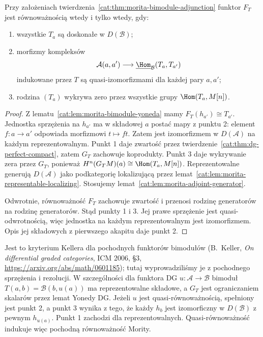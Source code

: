 \begin{twierdzenie}\label{cat:thm:morita-bimodule-criterion}
Przy założeniach twierdzenia~\ref{cat:thm:morita-bimodule-adjunction} funktor $F_T$ jest równoważnością wtedy i tylko wtedy, gdy:
\begin{enumerate}
 \item wszystkie $T_a$ są doskonałe w $D(\mathcal B)$;
 \item morfizmy kompleksów
 \[
 \mathcal A(a,a')\longrightarrow
 \underline{\Hom}_{\mathcal B}(T_a,T_{a'})
 \]
 indukowane przez $T$ są quasi-izomorfizmami dla każdej pary $a,a'$;
 \item rodzina $(T_a)$ wykrywa zero przez wszystkie grupy $\Hom(T_a,M[n])$.
\end{enumerate}
\end{twierdzenie}
\begin{proof}
Z lematu~\ref{cat:lem:morita-bimodule-yoneda} mamy $F_T(h_{a'})\cong T_{a'}$. Jednostka sprzężenia na $h_{a'}$ ma w składowej $a$ postać mapy z punktu 2: element $f:a\to a'$ odpowiada morfizmowi $t\mapsto ft$. Zatem jest izomorfizmem w $D(\mathcal A)$ na każdym reprezentowalnym. Punkt 1 daje zwartość przez twierdzenie~\ref{cat:thm:dg-perfect-compact}, zatem $G_T$ zachowuje koprodukty. Punkt 3 daje wykrywanie zera przez $G_T$, ponieważ $H^n(G_TM)(a)\cong\Hom(T_a,M[n])$. Reprezentowalne generują $D(\mathcal A)$ jako podkategorię lokalizującą przez lemat~\ref{cat:lem:morita-representable-localizing}. Stosujemy lemat~\ref{cat:lem:morita-adjoint-generator}.

Odwrotnie, równoważność $F_T$ zachowuje zwartość i przenosi rodzinę generatorów na rodzinę generatorów. Stąd punkty 1 i 3. Jej prawe sprzężenie jest quasi-odwrotnością, więc jednostka na każdym reprezentowalnym jest izomorfizmem. Opis jej składowych z pierwszego akapitu daje punkt 2.
\end{proof}

Jest to kryterium Kellera dla pochodnych funktorów bimodułów (B.~Keller, \emph{On differential graded categories}, ICM 2006, \S3, \url{https://arxiv.org/abs/math/0601185}); tutaj wyprowadziliśmy je z pochodnego sprzężenia i rezolucji. W szczególności dla funktora DG $u:\mathcal A\to\mathcal B$ bimoduł $T(a,b)=\mathcal B(b,u(a))$ ma reprezentowalne składowe, a $G_T$ jest ograniczaniem skalarów przez lemat Yonedy DG. Jeżeli $u$ jest quasi-równoważnością, spełniony jest punkt 2, a punkt 3 wynika z tego, że każdy $h_b$ jest izomorficzny w $D(\mathcal B)$ z pewnym $h_{u(a)}$. Punkt 1 zachodzi dla reprezentowalnych. Quasi-równoważność indukuje więc pochodną równoważność Mority.

